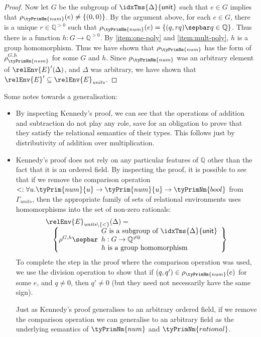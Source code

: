 \begin{proof}
  Now let $G$ be the subgroup of $\idxTms{\Delta}{\mathsf{unit}}$ such
  that $e \in G$ implies that $\rho_{\tyPrimNm{num}}(e) \not=
  \{(0,0)\}$. By the argument above, for each $e \in G$, there is a
  unique $r \in \mathbb{Q}^{>0}$ such that $\rho_{\tyPrimNm{num}}(e) =
  \{ (q,rq) \sepbar q \in \mathbb{Q} \}$. Thus there is a function $h
  : G \to \mathbb{Q}^{>0}$. By \ref{item:one-poly} and
  \ref{item:mult-poly}, $h$ is a group homomorphism. Thus we have
  shown that $\rho_{\tyPrimNm{num}}$ has the form of
  $\rho^{G,h}_{\tyPrimNm{num}}$ for some $G$ and $h$. Since
  $\rho_{\tyPrimNm{num}}$ was an arbitrary element of
  $\relEnv{E}'(\Delta)$, and $\Delta$ was arbitrary, we have shown
  that $\relEnv{E}' \subseteq \relEnv{E}_{\mathit{units}}$.
\end{proof}

Some notes towards a generalisation:
\begin{itemize}
\item By inspecting Kennedy's proof, we can see that the operations of
  addition and subtraction do not play any role, save for an
  obligation to prove that they satisfy the relational semantics of
  their types. This follows just by distributivity of addition over
  multiplication.
\item Kennedy's proof does not rely on any particular features of
  $\mathbb{Q}$ other than the fact that it is an ordered field. By
  inspecting the proof, it is possible to see that if we remove the
  comparison operation $< : \forall u. \tyPrim{num}{u} \to
  \tyPrim{num}{u} \to \tyPrimNm{bool}$ from $\Gamma_{\mathit{units}}$,
  then the appropriate family of sets of relational environments uses
  homomorphisms into the set of non-zero rationals:
  \begin{displaymath}
    \begin{array}{l}
      \relEnv{E}_{\mathit{units}\backslash\{<\}}(\Delta) = \\
      \quad\left\{ \rho^{G,h} \sepbar
        \begin{array}{l}
          G\textrm{ is a subgroup of }\idxTms{\Delta}{\mathsf{unit}} \\
          h : G \to \mathbb{Q}^{\not=0} \\
          h\textrm{ is a group homomorphism}
        \end{array}
      \right\}
    \end{array}
  \end{displaymath}
  To complete the step in the proof where the comparison operation was
  used, we use the division operation to show that if $(q,q') \in
  \rho_{\tyPrimNm{num}}(e)$ for some $e$, and $q \not= 0$, then $q'
  \not= 0$ (but they need not necessarily have the same sign).

  Just as Kennedy's proof generalises to an arbitrary ordered field,
  if we remove the comparison operation we can generalise to an
  arbitrary field as the underlying semantics of $\tyPrimNm{num}$ and
  $\tyPrimNm{rational}$.
\end{itemize}

